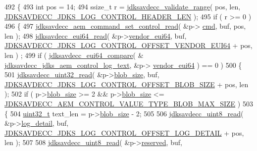 \begin{DoxyCode}
492 \{
493     \textcolor{keywordtype}{int} pos = 14;
494     ssize\_t r = \hyperlink{group__util_ga9c02bdfe76c69163647c3196db7a73a1}{jdksavdecc\_validate\_range}( pos, len, 
      \hyperlink{group__jdks__log_gaade756dffaac6e4f6d3d3b16e4cea38b}{JDKSAVDECC\_JDKS\_LOG\_CONTROL\_HEADER\_LEN} );
495     \textcolor{keywordflow}{if} ( r >= 0 )
496     \{
497         \hyperlink{group__command__set__control_ga3bffaa14c2bd112de565accfef21fedd}{jdksavdecc\_aem\_command\_set\_control\_read}( &p->
      \hyperlink{group__jdks_ga0c878e1ddbac611b7218077c5c482cde}{cmd}, buf, pos, len );
498         \hyperlink{group__eui64_ga7c7ee5c2d293106f4d997affcbc3ef15}{jdksavdecc\_eui64\_read}( &p->\hyperlink{group__jdks_ga6183c85748a8af0003d293d653c4ae9b}{vendor\_eui64}, buf, 
      \hyperlink{group__jdks__log_gaa09f0dec1864081c2abbc426b9e387fd}{JDKSAVDECC\_JDKS\_LOG\_CONTROL\_OFFSET\_VENDOR\_EUI64} + pos, len )
      ;
499         \textcolor{keywordflow}{if} ( \hyperlink{group__eui64_ga1d7414dc665866d8ad0af100f8a52ef2}{jdksavdecc\_eui64\_compare}( &
      \hyperlink{group__jdks__log_ga492c3be3079a48fdf9366bdc514c0333}{jdksavdecc\_jdks\_aem\_control\_log\_text}, &p->
      \hyperlink{group__jdks_ga6183c85748a8af0003d293d653c4ae9b}{vendor\_eui64} ) == 0 )
500         \{
501             \hyperlink{group__endian_gaf75f53076978e7b51f12c19414e6070e}{jdksavdecc\_uint32\_read}( &p->\hyperlink{group__jdks_ga32143551b70893faef60f6e35f88ed50}{blob\_size}, buf, 
      \hyperlink{group__jdks__log_ga14027480ca9c47f6e02e3d96e3e9a1ad}{JDKSAVDECC\_JDKS\_LOG\_CONTROL\_OFFSET\_BLOB\_SIZE} + pos, len );
502             \textcolor{keywordflow}{if} ( p->\hyperlink{group__jdks_ga32143551b70893faef60f6e35f88ed50}{blob\_size} >= 2 && p->\hyperlink{group__jdks_ga32143551b70893faef60f6e35f88ed50}{blob\_size} <= 
      \hyperlink{group__aem__command_ga91176affe15020f1b22b04518eeb3d30}{JDKSAVDECC\_AEM\_CONTROL\_VALUE\_TYPE\_BLOB\_MAX\_SIZE} )
503             \{
504                 \hyperlink{parse_8c_a6eb1e68cc391dd753bc8ce896dbb8315}{uint32\_t} text\_len = p->\hyperlink{group__jdks_ga32143551b70893faef60f6e35f88ed50}{blob\_size} - 2;
505 
506                 \hyperlink{group__endian_ga25eac79531675b56aaa5d7870d880b33}{jdksavdecc\_uint8\_read}( &p->\hyperlink{group__jdks_ga61044f81305d515f41eea13f02f3cb81}{log\_detail}, buf, 
      \hyperlink{group__jdks__log_ga15244e4065b3ef420cd990e0d2e6bc0d}{JDKSAVDECC\_JDKS\_LOG\_CONTROL\_OFFSET\_LOG\_DETAIL} + pos, len );
507 
508                 \hyperlink{group__endian_ga25eac79531675b56aaa5d7870d880b33}{jdksavdecc\_uint8\_read}( &p->\hyperlink{group__jdks_gacb7bc06bed6f6408d719334fc41698c7}{reserved}, buf, 

\end{DoxyCode}

